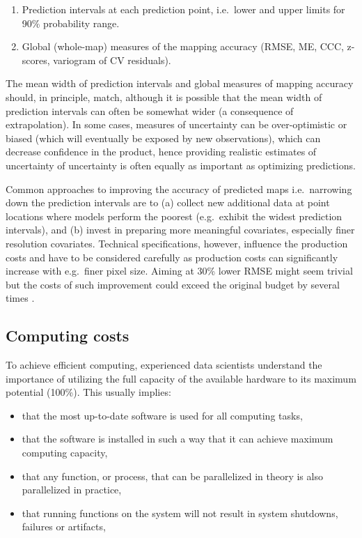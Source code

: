 \documentclass[graybox,natbib,nospthms,UStrade]{svmono}
\begin{document}
\begin{enumerate}
\def\labelenumi{\arabic{enumi}.}
\item
  Prediction intervals at each prediction point, i.e.~lower and upper
  limits for 90\% probability range.
\item
  Global (whole-map) measures of the mapping accuracy (RMSE, ME, CCC,
  z-scores, variogram of CV residuals).
\end{enumerate}

The mean width of prediction intervals and global measures of mapping
accuracy should, in principle, match, although it is possible that the
mean width of prediction intervals can often be somewhat wider (a
consequence of extrapolation). In some cases, measures of uncertainty can
be over-optimistic or biased (which will eventually be exposed by new
observations), which can decrease confidence in the product, hence
providing realistic estimates of uncertainty of uncertainty is often
equally as important as optimizing predictions.

Common approaches to improving the accuracy of predicted maps
i.e.~narrowing down the prediction intervals are to (a) collect new
additional data at point locations where models perform the poorest
(e.g.~exhibit the widest prediction intervals), and (b) invest in
preparing more meaningful covariates, especially finer resolution
covariates. Technical specifications, however, influence the production
costs and have to be considered carefully as production costs can
significantly increase with e.g.~finer pixel size. Aiming at 30\% lower
RMSE might seem trivial but the costs of such improvement could exceed
the original budget by several times \citep{Hengl2013JAG}.

\hypertarget{computing-costs}{%
\subsection{Computing costs}\label{computing-costs}}

To achieve efficient computing, experienced data scientists understand
the importance of utilizing the full capacity of the available hardware
to its maximum potential (100\%). This usually implies:

\begin{itemize}
\item
  that the most up-to-date software is used for all computing tasks,
\item
  that the software is installed in such a way that it can achieve
  maximum computing capacity,
\item
  that any function, or process, that can be parallelized in theory is
  also parallelized in practice,
\item
  that running functions on the system will not result in system
  shutdowns, failures or artifacts,
\end{itemize}
\end{document}
